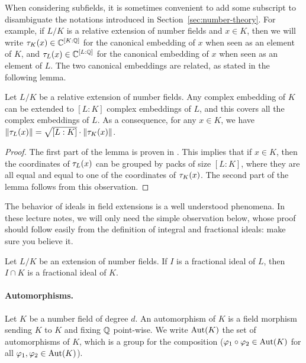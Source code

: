 When considering subfields, it is sometimes convenient to add some subscript to disambiguate the notations introduced in Section~\ref{sec:number-theory}. For example, if $L/K$ is a relative extension of number fields and $x \in K$, then we will write $\tau_K(x) \in \mathbb{C}^{[K:\mathbb{Q}]}$ for the canonical embedding of $x$ when seen as an element of $K$, and $\tau_L(x) \in \mathbb{C}^{[L:\mathbb{Q}]}$ for the canonical embedding of $x$ when seen as an element of $L$. The two canonical embeddings are related, as stated in the following lemma.

\begin{lemma}
\label{lemma:canonical-norm-subfield}
Let $L/K$ be a relative extension of number fields. Any complex embedding of $K$ can be extended to $[L:K]$ complex embeddings of $L$, and this covers all the complex embeddings of $L$.
As a consequence, for any $x \in K$, we have $\|\tau_L(x)\| = \sqrt{[L:K]} \cdot \|\tau_K(x)\|$.
\end{lemma}

\begin{proof}
The first part of the lemma is proven in \cite[Th. 50]{Marcus}. This implies that if $x \in K$, then the coordinates of $\tau_L(x)$ can be grouped by packs of size $[L:K]$, where they are all equal and equal to one of the coordinates of $\tau_K(x)$. The second part of the lemma follows from this observation.
\end{proof}

The behavior of ideals in field extensions is a well understood phenomena. In these lecture notes, we will only need the simple observation below, whose proof should follow easily from the definition of integral and fractional ideals: make sure you believe it.
\begin{lemma}
\label{lemma:intersection-ideal-subfield}
Let $L/K$ be an extension of number fields. If $I$ is a fractional ideal of $L$, then $I \cap K$ is a fractional ideal of $K$.
\end{lemma}


\paragraph{Automorphisms.} Let $K$ be a number field of degree $d$. An automorphism of $K$ is a field morphism sending $K$ to $K$ and fixing $\mathbb{Q}$ point-wise. We write $\operatorname{Aut}(K)$ the set of automorphisms of $K$, which is a group for the composition ($\varphi_1 \circ \varphi_2 \in \operatorname{Aut}(K)$ for all $\varphi_1, \varphi_2 \in \operatorname{Aut}(K)$).

